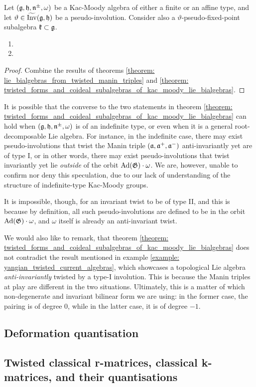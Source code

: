         \begin{corollary} \label{coro: twisted_forms_and_coideal_subalgebras_of_kac_moody_lie_bialgebras}
            Let $(\mathfrak{g}, \mathfrak{h}, \mathfrak{n}^{\pm}, \omega)$ be a Kac-Moody algebra of either a finite or an affine type, and let $\vartheta \in \widetilde{\operatorname{Inv}}(\mathfrak{g}, \mathfrak{h})$ be a pseudo-involution. Consider also a $\vartheta$-pseudo-fixed-point subalgebra $\mathfrak{k} \subset \mathfrak{g}$.
            \begin{enumerate}
                \item {} 
                \item {}
            \end{enumerate}
        \end{corollary}
            \begin{proof}
                Combine the results of theorems \ref{theorem: lie_bialgebras_from_twisted_manin_triples} and \ref{theorem: twisted_forms_and_coideal_subalgebras_of_kac_moody_lie_bialgebras}.
            \end{proof}
            
        \begin{remark}
            It is possible that the converse to the two statements in theorem \ref{theorem: twisted_forms_and_coideal_subalgebras_of_kac_moody_lie_bialgebras} can hold when $(\mathfrak{g}, \mathfrak{h}, \mathfrak{n}^{\pm}, \omega)$ is of an indefinite type, or even when it is a general root-decomposable Lie algebra. For instance, in the indefinite case, there may exist pseudo-involutions that twist the Manin triple $(\mathfrak{a}, \mathfrak{a}^+, \mathfrak{a}^-)$ anti-invariantly yet are of type I, or in other words, there may exist pseudo-involutions that twist invariantly yet lie \textit{outside} of the orbit $\mathrm{Ad}(\mathfrak{G}) \cdot \omega$. We are, however, unable to confirm nor deny this speculation, due to our lack of understanding of the structure of indefinite-type Kac-Moody groups.
            
            It is impossible, though, for an invariant twist to be of type II, and this is because by definition, all such pseudo-involutions are defined to be in the orbit $\mathrm{Ad}(\mathfrak{G}) \cdot \omega$, and $\omega$ itself is already an anti-invariant twist.

            We would also like to remark, that theorem \ref{theorem: twisted_forms_and_coideal_subalgebras_of_kac_moody_lie_bialgebras} does not contradict the result mentioned in example \ref{example: yangian_twisted_current_algebras}, which showcases a topological Lie algebra \textit{anti-invariantly} twisted by a type-I involution. This is because the Manin triples at play are different in the two situations. Ultimately, this is a matter of which non-degenerate and invariant bilinear form we are using: in the former case, the pairing is of degree $0$, while in the latter case, it is of degree $-1$.
        \end{remark}

    \subsection{Deformation quantisation}

    \subsection{Twisted classical r-matrices, classical k-matrices, and their quantisations}